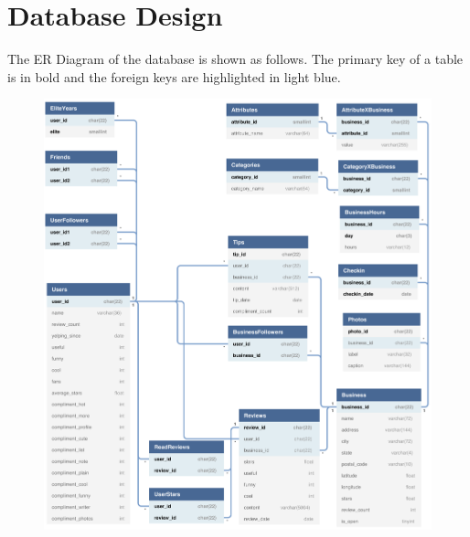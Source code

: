 \documentclass[12pt]{article}
\begin{document}
\section{Database Design}\label{section-dbdesign}
The ER Diagram of the database is shown as follows. The primary key of a table is in bold and the foreign keys are highlighted in light blue.
\begin{figure}[H]
\begin{center}
    \includegraphics[width=1.0\textwidth]{../03_dumpData/ER_Diagram.png}
\end{center}

\end{figure}
\end{document}

